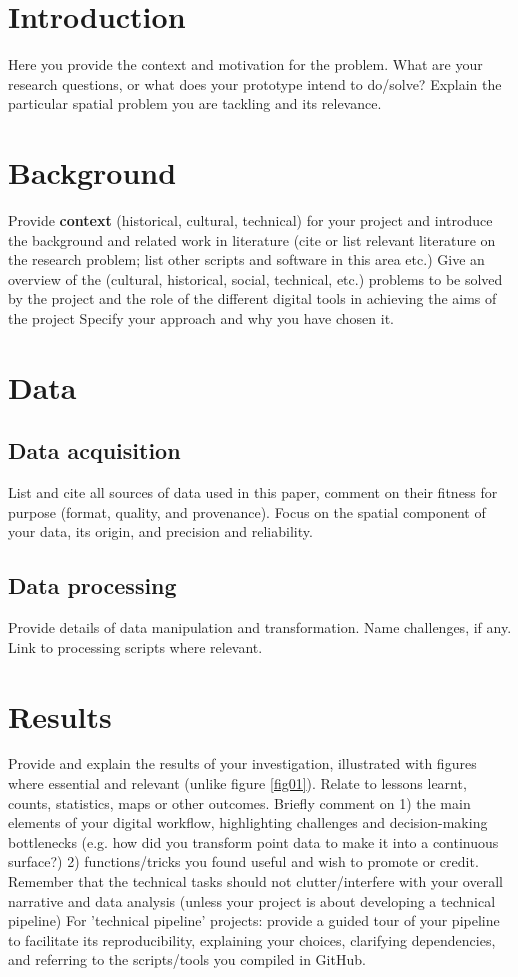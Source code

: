 \documentclass{article}
\begin{document}
\section{Introduction}
Here you provide the context and motivation for the problem. What are your research questions, or what does your prototype intend to do/solve? Explain the particular spatial problem you are tackling and its relevance. 

\section{Background}
Provide \textbf{context} (historical, cultural, technical) for your project and introduce the background and related work in literature (cite or list relevant literature on the research problem; list other scripts and software in this area etc.)
Give an overview of the (cultural, historical, social, technical, etc.) problems to be solved by the project and the role of the different digital tools in achieving the aims of the project
Specify your approach and why you have chosen it.

\section{Data}
\subsection{Data acquisition}
List and cite all sources of data used in this paper, comment on their fitness for purpose (format, quality, and provenance). Focus on the spatial component of your data, its origin, and precision and reliability. 

\subsection{Data processing}
Provide details of data manipulation and transformation. Name challenges, if any. Link to processing scripts where relevant.

\section{Results}
Provide and explain the results of your investigation, illustrated with figures where essential and relevant (unlike figure \ref{fig01}). Relate to lessons learnt, counts, statistics, maps or other outcomes.
Briefly comment on 1) the main elements of your digital workflow, highlighting challenges and decision-making bottlenecks (e.g. how did you transform point data to make it into a continuous surface?) 2) functions/tricks you found useful and wish to promote or credit. Remember that the technical tasks should not clutter/interfere with your overall narrative and data analysis (unless your project is about developing a technical pipeline) 
For 'technical pipeline' projects: provide a guided tour of your pipeline to facilitate its reproducibility, explaining your choices, clarifying dependencies, and referring to the scripts/tools you compiled in GitHub.
\end{document}
